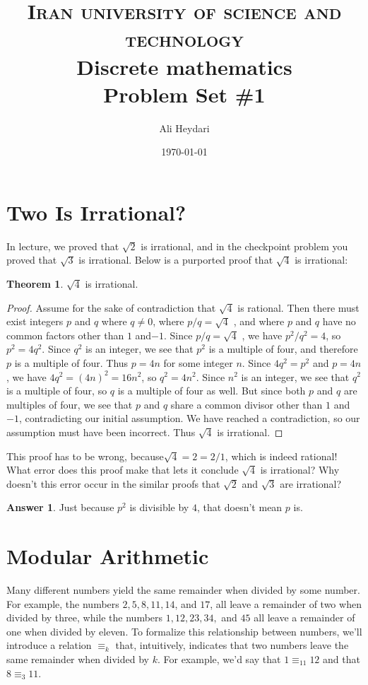 \documentclass{article}
\title{
\textsc{Iran university of science and technology} \\ [25pt] %
Discrete mathematics\\Problem Set \#1 \\
}
\author{Ali Heydari}
\date{\today}
\renewcommand{\(}{\left(}
\renewcommand{\)}{\right)}
\theoremstyle{plain}
\theoremstyle{plain}
\theoremstyle{definition}
\newtheorem*{answer}{Answer}
\newtheorem{theorem}{Theorem}[section]
\begin{document}
\maketitle

\section{Two Is Irrational?}

In lecture, we proved that $\sqrt{2}$ is irrational, and in the checkpoint problem you proved that $\sqrt{3}$ is irrational.
Below is a purported proof that $\sqrt{4}$ is irrational:

\begin{theorem}
  $\sqrt{4}$  is irrational.
\end{theorem}
\begin{proof}
  Assume for the sake of contradiction that $\sqrt{4}$ is rational. Then there must exist
integers $p$ and $q$ where $ q \neq 0 $, where $p / q = \sqrt{4}$ , and where $p$ and $q$ have no
common factors other than $1$ and$ -1$.
Since $p / q = \sqrt{4}$ , we have $p^2 / q^2 = 4$, so $p^2 = 4q^2$. Since $q^2$ is an integer, we see
that $p^2$ is a multiple of four, and therefore $p$ is a multiple of four. Thus $p = 4n$
for some integer $n$.
Since $4q^2 = p^2$ and $p = 4n$, we have $4q^2 = (4n)^2 = 16n^2$, so $q^2 = 4n^2$. Since $n^2$ is an
integer, we see that $q^2$ is a multiple of four, so $q$ is a multiple of four as well.
But since both $p$ and $q$ are multiples of four, we see that $p$ and $q$ share a common
divisor other than $1$ and $-1$, contradicting our initial assumption. We have
reached a contradiction, so our assumption must have been incorrect. Thus $\sqrt{4}$
is irrational.
\end{proof}
This proof has to be wrong, because$ \sqrt{4} = 2 = 2/1$, which is indeed rational!
What error does this proof make that lets it conclude $\sqrt{4}$ is irrational? Why doesn't this error occur
in the similar proofs that $\sqrt{2}$ and $\sqrt{3}$ are irrational?
\begin{shaded}
\begin{answer}
Just because $p^2$ is divisible by $4$, that doesn't mean $p$ is.
\end{answer}
\end{shaded}

\section{Modular Arithmetic}
Many different numbers yield the same remainder when divided by some number. For example, the
numbers $2, 5, 8, 11, 14$, and $17$, all leave a remainder of two when divided by three, while the numbers
$1, 12, 23, 34,$ and $45$ all leave a remainder of one when divided by eleven. To formalize this relationship
between numbers, we'll introduce a relation $ \equiv_k $  that, intuitively, indicates that two numbers
leave the same remainder when divided by $k$. For example, we'd say that $1 \equiv_{11} 12 $ and that $8 \equiv_3 11$.
\end{document}

